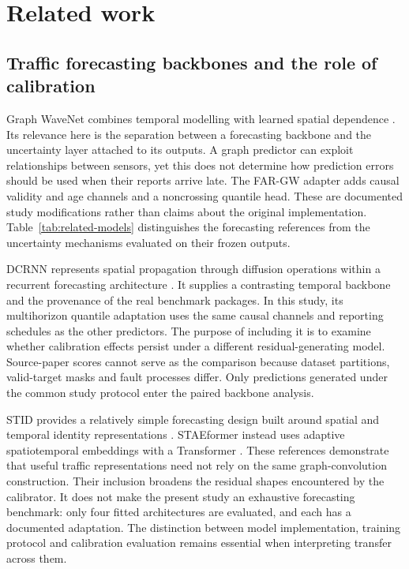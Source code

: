 \section{Related work}\label{sec:related}
\subsection{Traffic forecasting backbones and the role of calibration}
Graph WaveNet combines temporal modelling with learned spatial dependence \citep{wu2019}. Its relevance here is the separation between a forecasting backbone and the uncertainty layer attached to its outputs. A graph predictor can exploit relationships between sensors, yet this does not determine how prediction errors should be used when their reports arrive late. The FAR-GW adapter adds causal validity and age channels and a noncrossing quantile head. These are documented study modifications rather than claims about the original implementation. Table~\ref{tab:related-models} distinguishes the forecasting references from the uncertainty mechanisms evaluated on their frozen outputs.

DCRNN represents spatial propagation through diffusion operations within a recurrent forecasting architecture \citep{li2018}. It supplies a contrasting temporal backbone and the provenance of the real benchmark packages. In this study, its multihorizon quantile adaptation uses the same causal channels and reporting schedules as the other predictors. The purpose of including it is to examine whether calibration effects persist under a different residual-generating model. Source-paper scores cannot serve as the comparison because dataset partitions, valid-target masks and fault processes differ. Only predictions generated under the common study protocol enter the paired backbone analysis.

STID provides a relatively simple forecasting design built around spatial and temporal identity representations \citep{shao2022}. STAEformer instead uses adaptive spatiotemporal embeddings with a Transformer \citep{liu2023}. These references demonstrate that useful traffic representations need not rely on the same graph-convolution construction. Their inclusion broadens the residual shapes encountered by the calibrator. It does not make the present study an exhaustive forecasting benchmark: only four fitted architectures are evaluated, and each has a documented adaptation. The distinction between model implementation, training protocol and calibration evaluation remains essential when interpreting transfer across them.

